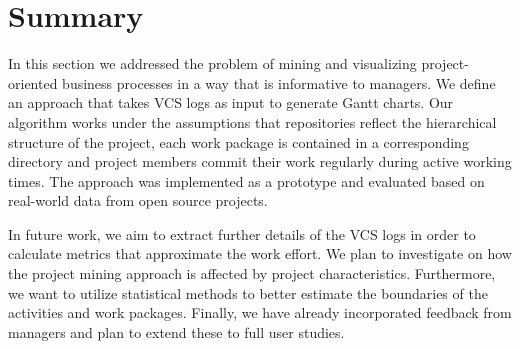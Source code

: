 \section{Summary}
\label{sec:bpm2015outro}

In this section we
addressed the problem of mining and visualizing project-oriented business processes in a way that is informative to managers. We define an approach that takes VCS logs as input to generate Gantt charts.
Our algorithm works under the assumptions that repositories reflect the hierarchical structure of the project, each work package is contained in a corresponding directory and project members commit their work regularly during active working times.
The approach was implemented as a prototype and evaluated based on real-world data from open source projects.

In future work, we aim to extract further details of the VCS logs in order to calculate metrics that approximate the work effort. %
We plan to investigate on how the project mining approach is affected by project characteristics. Furthermore, we want to utilize statistical methods to better estimate the boundaries of the activities and work packages. Finally, we have already incorporated feedback from managers and plan to extend these to full user studies.

